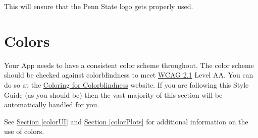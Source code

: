 \documentclass[
]{book}
\newenvironment{Shaded}{\begin{snugshade}}{\end{snugshade}}
\newcommand{\CommentTok}[1]{\textcolor[rgb]{0.56,0.35,0.01}{\textit{#1}}}
\newcommand{\DataTypeTok}[1]{\textcolor[rgb]{0.13,0.29,0.53}{#1}}
\newcommand{\DecValTok}[1]{\textcolor[rgb]{0.00,0.00,0.81}{#1}}
\newcommand{\KeywordTok}[1]{\textcolor[rgb]{0.13,0.29,0.53}{\textbf{#1}}}
\newcommand{\NormalTok}[1]{#1}
\newcommand{\OperatorTok}[1]{\textcolor[rgb]{0.81,0.36,0.00}{\textbf{#1}}}
\newcommand{\StringTok}[1]{\textcolor[rgb]{0.31,0.60,0.02}{#1}}
\begin{document}
\begin{Shaded}
\end{Shaded}

This will ensure that the Penn State logo gets properly used.

\hypertarget{colors}{%
\section{Colors}\label{colors}}

Your App needs to have a consistent color scheme throughout. The color scheme should be checked against colorblindness to meet \href{https://www.w3.org/WAI/WCAG21/quickref/}{WCAG 2.1} Level AA. You can do so at the \href{https://davidmathlogic.com/colorblind/\#\%23000000-\%23E69F00-\%2356B4E9-\%23009E73-\%23F0E442-\%230072B2-\%23D55E00-\%23CC79A7}{Coloring for Colorblindness} website. If you are following this Style Guide (as you should be) then the vast majority of this section will be automatically handled for you.

See \protect\hyperlink{colorUI}{Section \ref{colorUI}} and \protect\hyperlink{colorPlots}{Section \ref{colorPlots}} for additional information on the use of colors.
\end{document}
